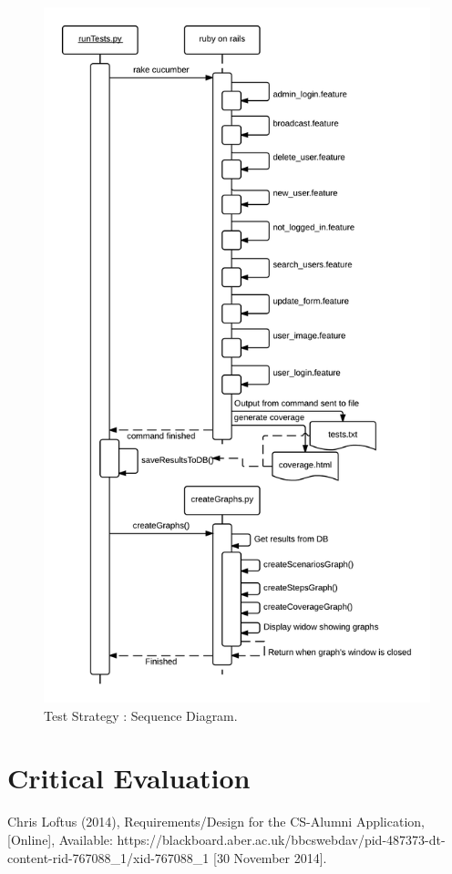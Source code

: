\documentclass[10pt,a4paper,titlepage]{article}
\begin{document}
\begin{figure}[H]
\begin{center}
\includegraphics[scale=0.25]{include/Sequence_Diagram.png}  
\caption{Test Strategy : Sequence Diagram. }
\label{fig:stateDiagram}
\end{center}
\end{figure}

\section{Critical Evaluation}

\begin{thebibliography}{1}

Chris Loftus (2014), Requirements/Design for the CS-Alumni Application, [Online], Available: https://blackboard.aber.ac.uk/bbcswebdav/pid-487373-dt-content-rid-767088\_1/xid-767088\_1 [30 November 2014].

\end{thebibliography}
\end{document}
